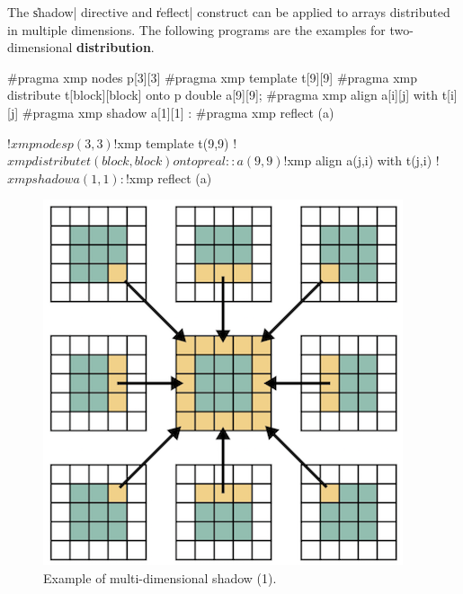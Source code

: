 

The \|shadow| directive and \|reflect| construct can be applied to
arrays distributed in multiple dimensions. The following programs are the
examples for two-dimensional {\bf distribution}.

\begin{XCexample}
#pragma xmp nodes p[3][3]
#pragma xmp template t[9][9]
#pragma xmp distribute t[block][block] onto p
double a[9][9];
#pragma xmp align a[i][j] with t[i][j]
#pragma xmp shadow a[1][1]
   :
#pragma xmp reflect (a)
\end{XCexample}

\begin{XFexample}
!$xmp nodes p(3,3)
!$xmp template t(9,9)
!$xmp distribute t(block,block) onto p
real :: a(9,9)
!$xmp align a(j,i) with t(j,i)
!$xmp shadow a(1,1)
   :
!$xmp reflect (a)
\end{XFexample}

\begin{figure}
  \centering
  \includegraphics{figs/multi1.png}
  \caption{Example of multi-dimensional shadow (1).}
\end{figure}

